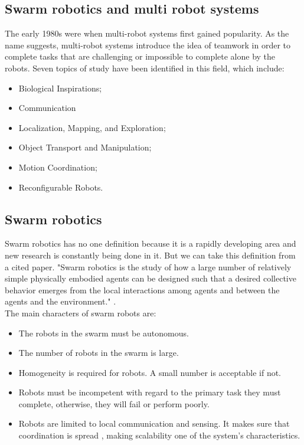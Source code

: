 \documentclass[12pt]{extarticle}
\begin{document}
\subsection{Swarm robotics and multi robot systems}
The early 1980s were when multi-robot systems first gained popularity. As the name suggests, multi-robot systems introduce the idea of teamwork in order to complete tasks that are challenging or impossible to complete alone by the robots. Seven topics of study have been identified in this field, which include: 
\begin{itemize} 
\item Biological Inspirations; 
\item Communication 
\item Localization, Mapping, and Exploration;
\item Object Transport and Manipulation; 
\item Motion Coordination; 
\item Reconfigurable Robots. 
\end{itemize}

 

\subsection{Swarm robotics}
Swarm robotics has no one definition because it is a rapidly developing area and new research is constantly being done in it. But we can take this definition from a cited paper. "Swarm robotics is the study of how a large number of relatively simple physically embodied agents can be designed such that a desired collective behavior emerges from the local interactions among agents and between the agents and the environment." \cite{csahin2005swarm}.\\
The main characters of swarm robots are:
 \begin{itemize} 
\item The robots in the swarm must be autonomous.
\item The number of robots in the swarm is large.
\item Homogeneity is required for robots. A small number is acceptable if not.
\item Robots must be incompetent with regard to the primary task they must complete, otherwise, they will fail or perform poorly.
\item Robots are limited to local communication and sensing. It makes sure that coordination is spread \cite{navarro2013introduction}, making scalability one of the system's characteristics.  \end{itemize}
\end{document}
